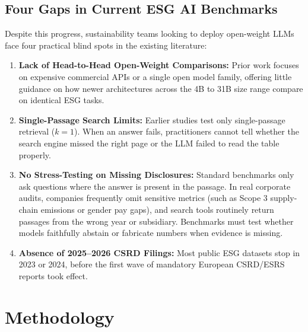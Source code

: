 \documentclass[11pt,letterpaper]{article}
\begin{document}
\subsection{Four Gaps in Current ESG AI Benchmarks}
Despite this progress, sustainability teams looking to deploy open-weight LLMs face four practical blind spots in the existing literature:
\begin{enumerate}[leftmargin=1.5em, itemsep=2pt]
  \item \textbf{Lack of Head-to-Head Open-Weight Comparisons:} Prior work focuses on expensive commercial APIs or a single open model family, offering little guidance on how newer architectures across the 4B to 31B size range compare on identical ESG tasks.
  \item \textbf{Single-Passage Search Limits:} Earlier studies test only single-passage retrieval ($k=1$). When an answer fails, practitioners cannot tell whether the search engine missed the right page or the LLM failed to read the table properly.
  \item \textbf{No Stress-Testing on Missing Disclosures:} Standard benchmarks only ask questions where the answer is present in the passage. In real corporate audits, companies frequently omit sensitive metrics (such as Scope 3 supply-chain emissions or gender pay gaps), and search tools routinely return passages from the wrong year or subsidiary. Benchmarks must test whether models faithfully abstain or fabricate numbers when evidence is missing.
  \item \textbf{Absence of 2025--2026 CSRD Filings:} Most public ESG datasets stop in 2023 or 2024, before the first wave of mandatory European CSRD/ESRS reports took effect.
\end{enumerate}

\section{Methodology}
\label{sec:method}
\end{document}
